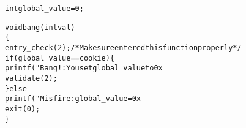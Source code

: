 \begin{alltt}
int global_value = 0;

void bang(int val)
\verb:{:
    entry_check(2);  /* Make sure entered this function properly */
    if (global_value == cookie) \verb:{:
        printf("Bang!: You set global_value to 0x%x\verb:\n:", global_value);
        validate(2);
    \verb:}: else
        printf("Misfire: global_value = 0x%x\verb:\n:", global_value);
    exit(0);
\verb:}:
\end{alltt}
